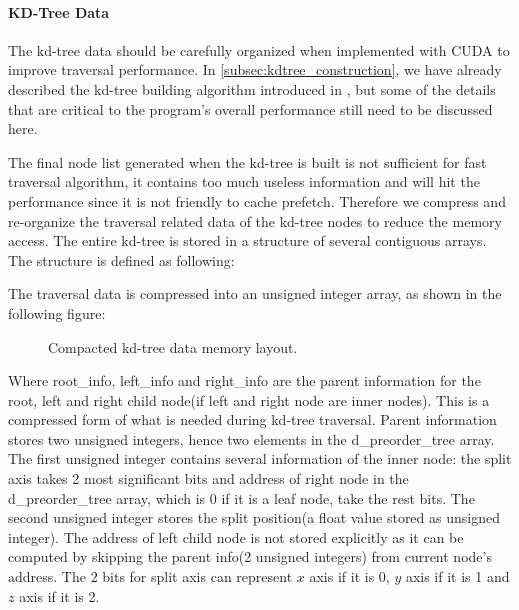 \paragraph{KD-Tree Data} 

The kd-tree data should be carefully organized when implemented with CUDA to improve traversal performance. In \ref{subsec:kdtree_construction}, we have already described the kd-tree building algorithm introduced in \cite{Zhou2008}, but some of the details that are critical to the program's overall performance still need to be discussed here. 

The final node list generated when the kd-tree is built is not sufficient for fast traversal algorithm, it contains too much useless information and will hit the performance since it is not friendly to cache prefetch. Therefore we compress and re-organize the traversal related data of the kd-tree nodes to reduce the memory access. The entire kd-tree is stored in a structure of several contiguous arrays. The structure is defined as following:  

 

The traversal data is compressed into an unsigned integer array, as shown in the following figure: 

\begin{figure}[htp] 
    \centering 
    \renewcommand{\thefigure}{\thechapter.\arabic{figure}}
    \caption[]{Compacted kd-tree data memory layout.}
    \label{fig:kdtree_data_memory_layout} 
\end{figure}  

Where root\_info, left\_info and right\_info are the parent information for the root, left and right child node(if left and right node are inner nodes). This is a compressed form of what is needed during kd-tree traversal. Parent information stores two unsigned integers, hence two elements in the d\_preorder\_tree array. The first unsigned integer contains several information of the inner node: the split axis takes 2 most significant bits and address of right node in the d\_preorder\_tree array, which is 0 if it is a leaf node, take the rest bits. The second unsigned integer stores the split position(a float value stored as unsigned integer). The address of left child node is not stored explicitly as it can be computed by skipping the parent info(2 unsigned integers) from current node's address. The 2 bits for split axis can represent \(x\) axis if it is 0, \(y\) axis if it is 1 and \(z\) axis if it is 2. 

